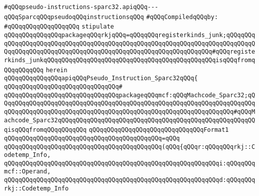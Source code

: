 \label{src/lib/compiler/back/low/sparc32/treecode/pseudo-instructions-sparc32.api}
\verb|#qQQqpseudo-instructions-sparc32.apiqQQq---qQQqSparcqQQqpseudoqQQqinstructionsqQQq|\newline
\newline
\verb|#qQQqCompiledqQQqby:|\newline
\verb|#qQQqqQQqqQQqqQQqqQQq|\newline
\newline
\verb|stipulate|\newline
\verb|qQQqqQQqqQQqqQQqpackageqQQqrkjqQQq=qQQqqQQqregisterkinds_junk;qQQqqQQqqQQqqQQqqQQqqQQqqQQqqQQqqQQqqQQqqQQqqQQqqQQqqQQqqQQqqQQqqQQqqQQqqQQqqQQqqQQqqQQqqQQqqQQqqQQqqQQqqQQqqQQqqQQqqQQqqQQqqQQqqQQqqQQq#qQQqregisterkinds_junkqQQqqQQqqQQqqQQqqQQqqQQqqQQqqQQqqQQqqQQqqQQqqQQqisqQQqfromqQQqqQQqqQQq|\newline
\verb|herein|\newline
\newline
\verb|qQQqqQQqqQQqqQQqapiqQQqPseudo_Instruction_Sparc32qQQq{|\newline
\verb|qQQqqQQqqQQqqQQqqQQqqQQqqQQqqQQq#|\newline
\verb|qQQqqQQqqQQqqQQqqQQqqQQqqQQqqQQqpackageqQQqmcf:qQQqMachcode_Sparc32;qQQqqQQqqQQqqQQqqQQqqQQqqQQqqQQqqQQqqQQqqQQqqQQqqQQqqQQqqQQqqQQqqQQqqQQqqQQqqQQqqQQqqQQqqQQqqQQqqQQqqQQqqQQqqQQqqQQqqQQqqQQqqQQqqQQqqQQq#qQQqMachcode_Sparc32qQQqqQQqqQQqqQQqqQQqqQQqqQQqqQQqqQQqqQQqqQQqqQQqqQQqqQQqisqQQqfromqQQqqQQqqQQq|\newline
\newline
\verb|qQQqqQQqqQQqqQQqqQQqqQQqqQQqqQQqFormat1|\newline
\verb|qQQqqQQqqQQqqQQqqQQqqQQqqQQqqQQqqQQqqQQqqQQq=qQQq|\newline
\verb|qQQqqQQqqQQqqQQqqQQqqQQqqQQqqQQqqQQqqQQqqQQq(qQQq{qQQqr:qQQqqQQqrkj::Codetemp_Info,|\newline
\verb|qQQqqQQqqQQqqQQqqQQqqQQqqQQqqQQqqQQqqQQqqQQqqQQqqQQqqQQqqQQqi:qQQqqQQqmcf::Operand,|\newline
\verb|qQQqqQQqqQQqqQQqqQQqqQQqqQQqqQQqqQQqqQQqqQQqqQQqqQQqqQQqqQQqd:qQQqqQQqrkj::Codetemp_Info|\newline

